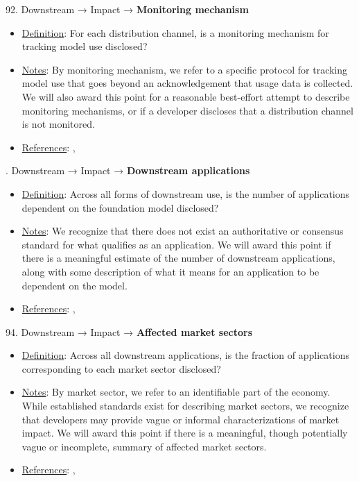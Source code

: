 92. Downstream → Impact → \textbf{Monitoring mechanism}
\vspace{-\parskip}
\begin{itemize}
	\item
	\underline{Definition}: For each distribution channel, is a monitoring mechanism for tracking model use disclosed?
	\item
	\underline{Notes}: By monitoring mechanism, we refer to a specific protocol for tracking model use that goes beyond an acknowledgement that usage data is collected. We will also award this point for a reasonable best-effort attempt to describe monitoring mechanisms, or if a developer discloses that a distribution channel is not monitored.
	\item
	\underline{References}: \citet{springer2018progressive}, \citet{bommasani2023ecosystem}
\end{itemize}


. Downstream → Impact → \textbf{Downstream applications}
\vspace{-\parskip}
\begin{itemize}
	\item
	\underline{Definition}: Across all forms of downstream use, is the number of applications dependent on the foundation model disclosed?
	\item
	\underline{Notes}: We recognize that there does not exist an authoritative or consensus standard for what qualifies as an application. We will award this point if there is a meaningful estimate of the number of downstream applications, along with some description of what it means for an application to be dependent on the model.
	\item
	\underline{References}: \citet{vipra2023concentration}, \citet{bommasani2023ecosystem}
\end{itemize}


94. Downstream → Impact → \textbf{Affected market sectors}
\vspace{-\parskip}
\begin{itemize}
	\item
	\underline{Definition}: Across all downstream applications, is the fraction of applications corresponding to each market sector disclosed?
	\item
	\underline{Notes}: By market sector, we refer to an identifiable part of the economy. While established standards exist for describing market sectors, we recognize that developers may provide vague or informal characterizations of market impact. We will award this point if there is a meaningful, though potentially vague or incomplete, summary of affected market sectors.
	\item
	\underline{References}: \citet{vipra2023concentration}, \citet{bommasani2023ecosystem}
\end{itemize}


